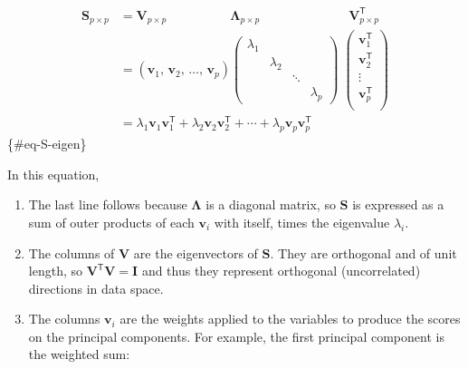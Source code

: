 \documentclass[
  letterpaper,
  10pt,
  krantz2]{krantz}
\begin{document}
\begin{align}
\mathbf{S}_{p \times p} & = \mathbf{V}_{p \times p} \phantom{0000000000} 
                            \mathbf{\Lambda}_{p \times p} \phantom{00000000000000}
                            \mathbf{V}_{p \times p}^\mathsf{T} \\
           & = \left( \mathbf{v}_1, \, \mathbf{v}_2, \,\dots, \, \mathbf{v}_p \right)
           \begin{pmatrix}
             \lambda_1 &  &  & \\ 
             & \lambda_2  &   & \\ 
             &  & \ddots & \\ 
             &  &  & \lambda_p 
            \end{pmatrix}
            \;
            \begin{pmatrix}
            \mathbf{v}_1^\mathsf{T}\\ 
            \mathbf{v}_2^\mathsf{T}\\ 
            \vdots\\ 
            \mathbf{v}_p^\mathsf{T}\\ 
            \end{pmatrix}
           \\
           & = \lambda_1 \mathbf{v}_1 \mathbf{v}_1^\mathsf{T} + \lambda_2 \mathbf{v}_2 \mathbf{v}_2^\mathsf{T} + \cdots + \lambda_p \mathbf{v}_p \mathbf{v}_p^\mathsf{T}
\end{align} \{\#eq-S-eigen\}

In this equation,

\begin{enumerate}
\def\labelenumi{\arabic{enumi}.}
\item
  The last line follows because \(\mathbf{\Lambda}\) is a diagonal
  matrix, so \(\mathbf{S}\) is expressed as a sum of outer products of
  each \(\mathbf{v}_i\) with itself, times the eigenvalue \(\lambda_i\).
\item
  The columns of \(\mathbf{V}\) are the eigenvectors of \(\mathbf{S}\).
  They are orthogonal and of unit length, so
  \(\mathbf{V}^\mathsf{T} \mathbf{V} = \mathbf{I}\) and thus they
  represent orthogonal (uncorrelated) directions in data space.
\item
  The columns \(\mathbf{v}_i\) are the weights applied to the variables
  to produce the scores on the principal components. For example, the
  first principal component is the weighted sum:
\end{enumerate}
\end{document}
